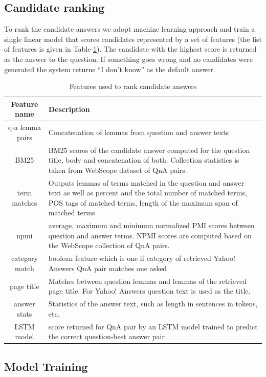 \documentclass[]{article}
\begin{document}
\subsection{Candidate ranking}

To rank the candidate answers we adopt machine learning approach and train a single linear model that scores candidates represented by a set of features (the list of features is given in Table \ref{table:features}).
The candidate with the highest score is returned as the answer to the question.
If something goes wrong and no candidates were generated the system returns ``I don't know'' as the default answer.

\begin{table}[t]
\caption{Features used to rank candidate answers}
\begin{tabular}{|c|p{13cm}|}
\hline
Feature name & Description \\
\hline
\hline
q-a lemma pairs & Concatenation of lemmas from question and answer texts\\
BM25 & BM25 scores of the candidate answer computed for the question title, body and concatenation of both. Collection statistics is taken from WebScope dataset of QnA pairs. \\
term matches & Outputs lemmas of terms matched in the question and answer text as well as percent and the total number of matched terms, POS tags of matched terms, length of the maximum span of matched terms\\
npmi & average, maximum and minimum normalized PMI scores between question and answer terms. NPMI scores are computed based on the WebScope collection of QnA pairs.\\
category match & boolean feature which is one if category of retrieved Yahoo! Answers QnA pair matches one asked\\
page title & Matches between question lemmas and lemmas of the retrieved page title. For Yahoo! Answers question text is used as the title.\\
answer stats & Statistics of the answer text, such as length in sentences in tokens, etc.\\
LSTM model & score returned for QnA pair by an LSTM model trained to predict the correct question-best answer pair\\
\hline
\end{tabular}
\label{table:features}
\end{table}

\subsection{Model Training}
\end{document}
